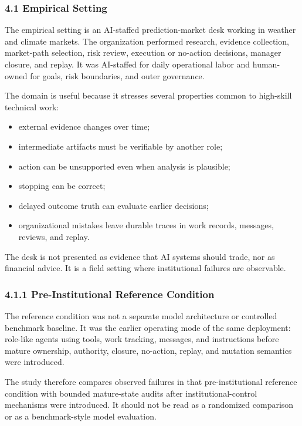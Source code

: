 \documentclass[
]{article}
\providecommand{\tightlist}{%
  \setlength{\itemsep}{0pt}\setlength{\parskip}{0pt}}
\begin{document}
\subsubsection{4.1 Empirical Setting}\label{empirical-setting}

The empirical setting is an AI-staffed prediction-market desk working in weather and climate markets. The organization performed research, evidence collection, market-path selection, risk review, execution or no-action decisions, manager closure, and replay. It was AI-staffed for daily operational labor and human-owned for goals, risk boundaries, and outer governance.

The domain is useful because it stresses several properties common to high-skill technical work:

\begin{itemize}
\tightlist
\item
  external evidence changes over time;
\item
  intermediate artifacts must be verifiable by another role;
\item
  action can be unsupported even when analysis is plausible;
\item
  stopping can be correct;
\item
  delayed outcome truth can evaluate earlier decisions;
\item
  organizational mistakes leave durable traces in work records, messages, reviews, and replay.
\end{itemize}

The desk is not presented as evidence that AI systems should trade, nor as financial advice. It is a field setting where institutional failures are observable.

\subsubsection{4.1.1 Pre-Institutional Reference Condition}\label{pre-institutional-reference-condition}

The reference condition was not a separate model architecture or controlled benchmark baseline. It was the earlier operating mode of the same deployment: role-like agents using tools, work tracking, messages, and instructions before mature ownership, authority, closure, no-action, replay, and mutation semantics were introduced.

The study therefore compares observed failures in that pre-institutional reference condition with bounded mature-state audits after institutional-control mechanisms were introduced. It should not be read as a randomized comparison or as a benchmark-style model evaluation.
\end{document}
